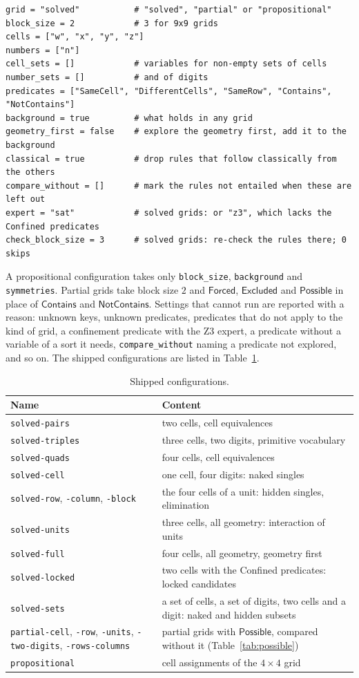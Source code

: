 \documentclass[11pt,a4paper]{article}
\theoremstyle{definition}
\theoremstyle{remark}
\newcommand{\code}[1]{\texttt{#1}}
\newcommand{\pred}[1]{\mathsf{#1}}
\newcommand{\Contains}{\pred{Contains}}
\newcommand{\NotContains}{\pred{NotContains}}
\newcommand{\Forced}{\pred{Forced}}
\newcommand{\Excluded}{\pred{Excluded}}
\begin{document}
\begin{Verbatim}
grid = "solved"           # "solved", "partial" or "propositional"
block_size = 2            # 3 for 9x9 grids
cells = ["w", "x", "y", "z"]
numbers = ["n"]
cell_sets = []            # variables for non-empty sets of cells
number_sets = []          # and of digits
predicates = ["SameCell", "DifferentCells", "SameRow", "Contains", "NotContains"]
background = true         # what holds in any grid
geometry_first = false    # explore the geometry first, add it to the background
classical = true          # drop rules that follow classically from the others
compare_without = []      # mark the rules not entailed when these are left out
expert = "sat"            # solved grids: or "z3", which lacks the Confined predicates
check_block_size = 3      # solved grids: re-check the rules there; 0 skips
\end{Verbatim}
A propositional configuration takes only \code{block\_size}, \code{background} and \code{symmetries}. Partial grids take block size $2$ and $\Forced$, $\Excluded$ and $\pred{Possible}$ in place of $\Contains$ and $\NotContains$. Settings that cannot run are reported with a reason: unknown keys, unknown predicates, predicates that do not apply to the kind of grid, a confinement predicate with the Z3 expert, a predicate without a variable of a sort it needs, \code{compare\_without} naming a predicate not explored, and so on. The shipped configurations are listed in Table~\ref{tab:configs}.

\begin{table}[t]
\centering\small
\begin{tabularx}{\textwidth}{@{}lX@{}}
\toprule
Name & Content \\
\midrule
\code{solved-pairs} & two cells, cell equivalences \\
\code{solved-triples} & three cells, two digits, primitive vocabulary \\
\code{solved-quads} & four cells, cell equivalences \\
\code{solved-cell} & one cell, four digits: naked singles \\
\code{solved-row}, \code{-column}, \code{-block} & the four cells of a unit: hidden singles, elimination \\
\code{solved-units} & three cells, all geometry: interaction of units \\
\code{solved-full} & four cells, all geometry, geometry first \\
\code{solved-locked} & two cells with the Confined predicates: locked candidates \\
\code{solved-sets} & a set of cells, a set of digits, two cells and a digit: naked and hidden subsets \\
\code{partial-cell}, \code{-row}, \code{-units}, \code{-two-digits}, \code{-rows-columns} & partial grids with $\pred{Possible}$, compared without it (Table~\ref{tab:possible}) \\
\code{propositional} & cell assignments of the $4 \times 4$ grid \\
\bottomrule
\end{tabularx}
\caption{Shipped configurations.}
\label{tab:configs}
\end{table}
\end{document}
